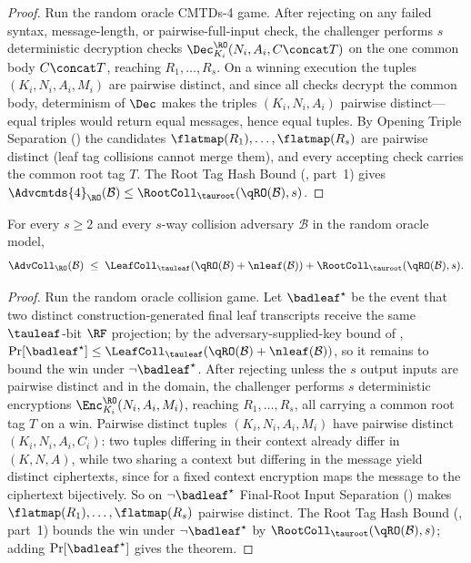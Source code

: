\begin{proof}
Run the random oracle CMTDs-4 game. After rejecting on any failed syntax,
message-length, or pairwise-full-input check, the challenger performs $s$
deterministic decryption checks $\Dec_{K_i}^\RO(N_i,A_i,C \concat T)$ on
the one common body $C \concat T$, reaching $R_1,\dots,R_s$. On a winning
execution the tuples $(K_i,N_i,A_i,M_i)$ are pairwise distinct, and since
all checks decrypt the common body, determinism of $\Dec$ makes the
triples $(K_i,N_i,A_i)$ pairwise distinct---equal triples would return
equal messages, hence equal tuples. By Opening Triple Separation
() the candidates $\flatmap(R_1),\dots,\flatmap(R_s)$
are pairwise distinct (leaf tag collisions cannot merge them), and every
accepting check carries the common root tag $T$. The Root Tag Hash Bound
(, part~1) gives
$\Advcmtds{4}_\RO(\mathcal{B}) \leq \RootColl_{\tauroot}(\qRO(\mathcal{B}), s)$.
\end{proof}

\begin{theorem}
\label{thm:coll-ro}
For every $s \geq 2$ and every $s$-way collision
adversary $\mathcal{B}$ in the \TW{} random oracle model,
\[
  \AdvColl_{\RO}(\mathcal{B})
  \;\leq\;
  \LeafColl_{\tauleaf}(\qRO(\mathcal{B})+\nleaf(\mathcal{B}))
  + \RootColl_{\tauroot}(\qRO(\mathcal{B}), s).
\]
\end{theorem}

\begin{proof}
Run the random oracle collision game. Let $\badleaf^\star$ be the event
that two distinct construction-generated final leaf transcripts receive
the same $\tauleaf$-bit $\RF$ projection; by the adversary-supplied-key
bound of ,
$\Pr[\badleaf^\star] \leq \LeafColl_{\tauleaf}(\qRO(\mathcal{B})+\nleaf(\mathcal{B}))$,
so it remains to bound the win under $\neg\badleaf^\star$. After rejecting
unless the $s$ output inputs are pairwise distinct and in the \TW{}
domain, the challenger performs $s$ deterministic encryptions
$\Enc_{K_i}^{\RO}(N_i,A_i,M_i)$, reaching $R_1,\dots,R_s$, all carrying a
common root tag $T$ on a win. Pairwise distinct tuples $(K_i,N_i,A_i,M_i)$
have pairwise distinct $(K_i,N_i,A_i,C_i)$: two tuples differing in their
context already differ in $(K,N,A)$, while two sharing a context but
differing in the message yield distinct ciphertexts, since for a fixed
context encryption maps the message to the ciphertext bijectively. So on
$\neg\badleaf^\star$ Final-Root Input Separation
() makes $\flatmap(R_1),\dots,\flatmap(R_s)$
pairwise distinct. The Root Tag Hash Bound (,
part~1) bounds the win under $\neg\badleaf^\star$ by
$\RootColl_{\tauroot}(\qRO(\mathcal{B}),s)$; adding $\Pr[\badleaf^\star]$
gives the theorem.
\end{proof}

